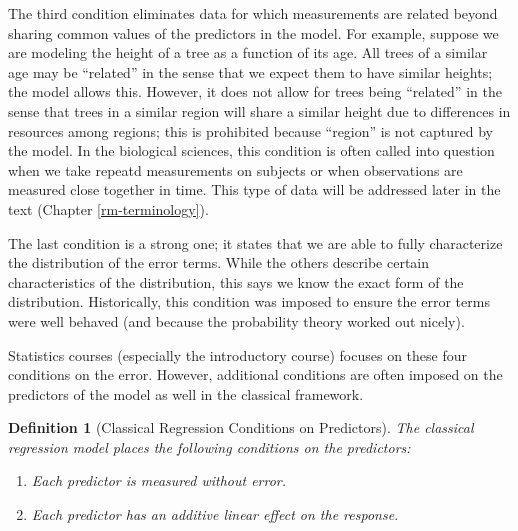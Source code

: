 \documentclass[
]{book}
\providecommand{\tightlist}{%
  \setlength{\itemsep}{0pt}\setlength{\parskip}{0pt}}
\theoremstyle{plain}
\theoremstyle{mydefn}
\newtheorem{definition}{Definition}[chapter]
\theoremstyle{myexmpl}
\theoremstyle{remark}
\begin{document}
The third condition eliminates data for which measurements are related beyond sharing common values of the predictors in the model. For example, suppose we are modeling the height of a tree as a function of its age. All trees of a similar age may be ``related'' in the sense that we expect them to have similar heights; the model allows this. However, it does not allow for trees being ``related'' in the sense that trees in a similar region will share a similar height due to differences in resources among regions; this is prohibited because ``region'' is not captured by the model. In the biological sciences, this condition is often called into question when we take repeatd measurements on subjects or when observations are measured close together in time. This type of data will be addressed later in the text (Chapter \ref{rm-terminology}).

The last condition is a strong one; it states that we are able to fully characterize the distribution of the error terms. While the others describe certain characteristics of the distribution, this says we know the exact form of the distribution. Historically, this condition was imposed to ensure the error terms were well behaved (and because the probability theory worked out nicely).

Statistics courses (especially the introductory course) focuses on these four conditions on the error. However, additional conditions are often imposed on the predictors of the model as well in the classical framework.

\begin{definition}[Classical Regression Conditions on Predictors]
\protect\hypertarget{def:defn-classical-regression-cont}{}{\label{def:defn-classical-regression-cont} {} }The classical regression model places the following conditions on the predictors:

\begin{enumerate}
\def\labelenumi{\arabic{enumi}.}
\tightlist
\item
  Each predictor is measured without error.
\item
  Each predictor has an additive linear effect on the response.
\end{enumerate}
\end{definition}
\end{document}
